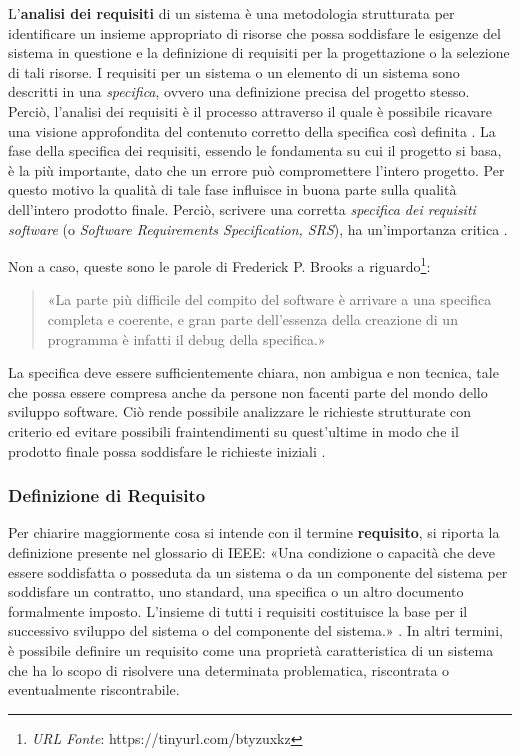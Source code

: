 L'\textbf{analisi dei requisiti} di un sistema è una metodologia strutturata per identificare un insieme appropriato di risorse che possa soddisfare le esigenze del sistema in questione e la definizione di requisiti per la progettazione o la selezione di tali risorse. I requisiti per un sistema o un elemento di un sistema sono descritti in una \textit{specifica}, ovvero una definizione precisa del progetto stesso. Perciò, l'analisi dei requisiti è il processo attraverso il quale è possibile ricavare una visione approfondita del contenuto corretto della specifica così definita \cite{system_requirements_analysis}.
La fase della specifica dei requisiti, essendo le fondamenta su cui il progetto si basa, è la più importante, dato che un errore può compromettere l'intero progetto. Per questo motivo la qualità di tale fase influisce in buona parte sulla qualità dell'intero prodotto finale. Perciò, scrivere una corretta \textit{specifica dei requisiti software} (o \textit{Software Requirements Specification, SRS}), ha un'importanza critica \cite{researchgate_srs_introduction}.

Non a caso, queste sono le parole di Frederick P. Brooks a riguardo\footnote{\textit{URL Fonte}: https://tinyurl.com/btyzuxkz}:

\begin{quote}
    «La parte più difficile del compito del software è arrivare a una specifica completa e coerente, e gran parte dell'essenza della creazione di un programma è infatti il debug della specifica.»
\end{quote}

La specifica deve essere sufficientemente chiara, non ambigua e non tecnica, tale che possa essere compresa anche da persone non facenti parte del mondo dello sviluppo software. Ciò rende possibile analizzare le richieste strutturate con criterio ed evitare possibili fraintendimenti su quest'ultime in modo che il prodotto finale possa soddisfare le richieste iniziali \cite{researchgate_srs_structure}.

\subsubsection{Definizione di Requisito}

Per chiarire maggiormente cosa si intende con il termine \textbf{requisito}, si riporta la definizione presente nel glossario di IEEE: «Una condizione o capacità che deve essere soddisfatta o posseduta da un sistema o da un componente del sistema per soddisfare un contratto, uno standard, una specifica o un altro documento formalmente imposto. L'insieme di tutti i requisiti costituisce la base per il successivo sviluppo del sistema o del componente del sistema.» \cite{software_requirements}. In altri termini, è possibile definire un requisito come una proprietà caratteristica di un sistema che ha lo scopo di risolvere una determinata problematica, riscontrata o eventualmente riscontrabile.

